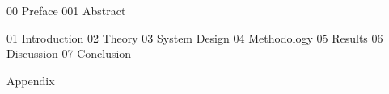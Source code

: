\documentclass{article}
\begin{document}

\frontmatter
\newpage
{00 Preface}
\newpage
{001 Abstract}
\newpage
\tableofcontents
\listoffigures
\listoftables


\newpage
\mainmatter
{01 Introduction}
\newpage
{02 Theory}
\newpage
{03 System Design}
\newpage
{04 Methodology}
\newpage
{05 Results}
\newpage
{06 Discussion}
\newpage
{07 Conclusion}

\newpage
\printbibliography[heading = bibintoc, title = References]

\addappendix
{Appendix}

\end{document}

